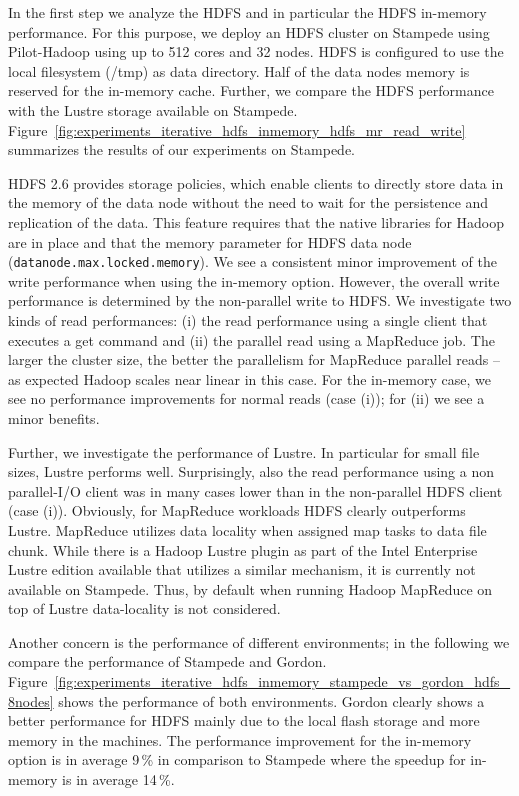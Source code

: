 \documentclass{sig-alternate}
\begin{document}
In the first step we analyze the HDFS and in particular the HDFS in-memory
performance. For this purpose, we deploy an HDFS cluster on Stampede using
Pilot-Hadoop using up to 512 cores and 32 nodes. HDFS is configured to use the
local filesystem (/tmp) as data directory. Half of the data nodes memory is
reserved for the in-memory cache. Further, we compare the HDFS performance with
the Lustre storage available on Stampede.
Figure~\ref{fig:experiments_iterative_hdfs_inmemory_hdfs_mr_read_write}
summarizes the results of our experiments on Stampede.

HDFS 2.6 provides storage policies, which enable clients to directly store data
in the memory of the data node without the need to wait for the persistence and
replication of the data. This feature requires that the native libraries for
Hadoop are in place and that the memory parameter for HDFS data node
(\texttt{datanode.max.locked.memory}). We see a consistent minor improvement of
the write performance when using the in-memory option. However, the overall
write performance is determined by the non-parallel write to HDFS. We
investigate two kinds of read performances: (i) the read performance using a
single client that executes a get command and (ii) the parallel read using a
MapReduce job. The larger the cluster size, the better the parallelism for
MapReduce parallel reads -- as expected Hadoop scales near linear in this case.
For the in-memory case, we see no performance improvements for normal reads
(case (i)); for (ii) we see a minor benefits.

Further, we investigate the performance of Lustre. In particular for small file
sizes, Lustre performs well. Surprisingly, also the read performance using a
non parallel-I/O client was in many cases lower than in the non-parallel HDFS
client (case (i)). Obviously, for MapReduce workloads HDFS clearly outperforms
Lustre. MapReduce utilizes data locality when assigned map tasks to data file
chunk. While there is a Hadoop Lustre plugin as part of the Intel Enterprise
Lustre edition available that utilizes a similar mechanism, it is currently not
available on Stampede. Thus, by default when running Hadoop MapReduce on top of
Lustre data-locality is not considered.



Another concern is the performance of different environments; in the following
we compare the performance of Stampede and Gordon.
Figure~\ref{fig:experiments_iterative_hdfs_inmemory_stampede_vs_gordon_hdfs_8nodes} shows the performance of both environments. Gordon clearly shows a better
performance for HDFS mainly due to the local flash storage and more memory in
the machines. The performance improvement for the in-memory option is in
average 9\,\% in comparison to Stampede where the speedup for in-memory is in
average 14\,\%.
\end{document}
